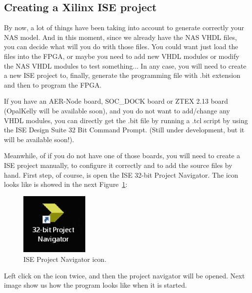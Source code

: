 
\subsection{Creating a Xilinx ISE project}

By now, a lot of things have been taking into account to generate correctly your NAS model. And in this moment, since we already have the NAS VHDL files, you can decide what will you do with those files. You could want just load the files into the FPGA, or maybe you need to add new VHDL modules or modify the NAS VHDL modules to test something... In any case, you will need to create a new ISE project to, finally, generate the programming file with .bit extension and then to program the FPGA.

If you have an AER-Node board, SOC\_DOCK board or ZTEX 2.13 board (OpalKelly will be available soon), and you do not want to add/change any VHDL modules, you can directly get the .bit file by running a .tcl script by using the ISE Design Suite 32 Bit Command Prompt. (Still under development, but it will be available soon!).

Meanwhile, of if you do not have one of those boards, you will need to create a ISE project manually, to configure it correctly and to add the source files by hand. First step, of course, is open the ISE 32-bit Project Navigator. The icon looks like is showed in the next Figure~\ref{fig:ISE_icon}:

\begin{figure}[H]
\centering
\includegraphics[width=0.3\textwidth]{images/Img26_FindISE.PNG}
\caption{\label{fig:ISE_icon}ISE Project Navigator icon.}
\end{figure}

Left click on the icon twice, and then the project navigator will be opened. Next image show us how the program looks like when it is started.

